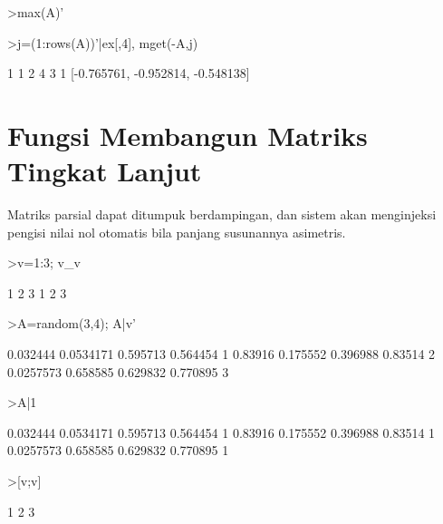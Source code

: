 \documentclass[a4paper,11pt,oneside,enabledeprecatedfontcommands]{scrbook}
\newenvironment{eulernotebook}{}{}
\newcommand{\eulerheading}[1]{\chapter{#1}}
\newenvironment{eulercomment}{\par\medskip\noindent}{\par\medskip}
\begin{document}
\begin{eulernotebook}
\begin{euleroutput}
[0.765761,  0.952814,  0.548138]
\end{euleroutput}
\begin{eulerprompt}
>max(A)'
\end{eulerprompt}
\begin{euleroutput}
[0.765761,  0.952814,  0.548138]
\end{euleroutput}
\begin{eulerprompt}
>j=(1:rows(A))'|ex[,4], mget(-A,j)
\end{eulerprompt}
\begin{euleroutput}
            1             1 
            2             4 
            3             1 
[-0.765761,  -0.952814,  -0.548138]
\end{euleroutput}

\eulerheading{Fungsi Membangun Matriks Tingkat Lanjut}
\begin{eulercomment}
Matriks parsial dapat ditumpuk berdampingan, dan sistem akan menginjeksi pengisi nilai nol otomatis bila panjang susunannya asimetris.
\end{eulercomment}
\begin{eulerprompt}
>v=1:3; v_v
\end{eulerprompt}
\begin{euleroutput}
            1             2             3 
            1             2             3 
\end{euleroutput}
\begin{eulerprompt}
>A=random(3,4); A|v'
\end{eulerprompt}
\begin{euleroutput}
     0.032444     0.0534171      0.595713      0.564454             1 
      0.83916      0.175552      0.396988       0.83514             2 
    0.0257573      0.658585      0.629832      0.770895             3 
\end{euleroutput}
\begin{eulerprompt}
>A|1
\end{eulerprompt}
\begin{euleroutput}
     0.032444     0.0534171      0.595713      0.564454             1 
      0.83916      0.175552      0.396988       0.83514             1 
    0.0257573      0.658585      0.629832      0.770895             1 
\end{euleroutput}
\begin{eulerprompt}
>[v;v]
\end{eulerprompt}
\begin{euleroutput}
            1             2             3 

\end{euleroutput}
\end{eulernotebook}
\end{document}
